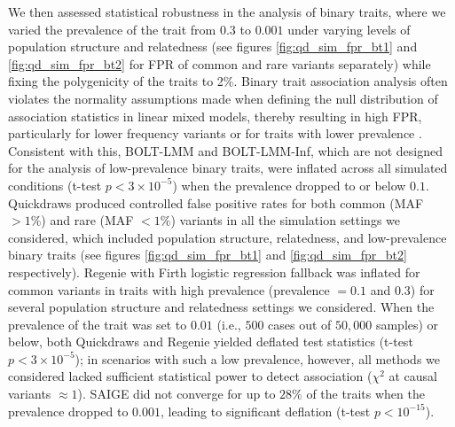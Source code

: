 %
We then assessed statistical robustness in the analysis of binary traits, where we varied the prevalence of the trait from $0.3$ to $0.001$ under varying levels of population structure and relatedness (see figures \ref{fig:qd_sim_fpr_bt1} and \ref{fig:qd_sim_fpr_bt2} for FPR of common and rare variants separately) while fixing the polygenicity of the traits to 2\%. 
%
Binary trait association analysis often violates the normality assumptions made when defining the null distribution of association statistics in linear mixed models, thereby resulting in high FPR, particularly for lower frequency variants or for traits with lower prevalence \cite{zhou2018efficiently}.
%
Consistent with this, BOLT-LMM and BOLT-LMM-Inf, which are not designed for the analysis of low-prevalence binary traits, were inflated across all simulated conditions (t-test $p < 3 \times 10^{-5}$) when the prevalence dropped to or below $0.1$. 
%
Quickdraws produced controlled false positive rates for both common (MAF $> 1\%$) and rare (MAF $< 1\%$) variants in all the simulation settings we considered, which included population structure, relatedness, and low-prevalence binary traits (see figures \ref{fig:qd_sim_fpr_bt1} and \ref{fig:qd_sim_fpr_bt2} respectively).
%
Regenie with Firth logistic regression fallback was inflated for common variants in traits with high prevalence (prevalence $=0.1$ and $0.3$) for several population structure and relatedness settings we considered.
%
When the prevalence of the trait was set to $0.01$ (i.e., $500$ cases out of $50{,}000$ samples) or below, both Quickdraws and Regenie yielded deflated test statistics (t-test $p < 3 \times 10^{-5}$); in scenarios with such a low prevalence, however, all methods we considered lacked sufficient statistical power to detect association ($\chi^2$ at causal variants ${\approx}1$).
%
SAIGE did not converge for up to $28\%$ of the traits when the prevalence dropped to $0.001$, leading to significant deflation (t-test $p < 10^{-15}$). 
%

